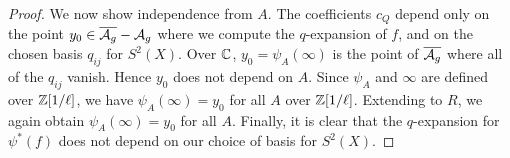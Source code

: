 \documentclass{amsart}
\begin{document}
\begin{proof}
  We now show independence from $A$. The coefficients $c_Q$ depend only on the point $y_0 \in \overline{\mathcal{A}_g} - \mathcal{A}_g$ where we compute the $q$-expansion of $f$, and on the chosen basis $q_{ij}$ for $S^2(X)$. Over $\mathbb{C}$, $y_0 = \psi_A(\infty)$ is the point of $\overline{\mathcal{A}_g}$ where all of the $q_{ij}$ vanish. Hence $y_0$ does not depend on $A$. Since $\psi_A$ and $\infty$ are defined over $\mathbb{Z}[1/\ell]$, we have $\psi_A(\infty) = y_0$ for all $A$ over $\mathbb{Z}[1/\ell]$. Extending to $R$, we again obtain $\psi_A(\infty) = y_0$ for all $A$. Finally, it is clear that the $q$-expansion for $\psi^*(f)$ does not depend on our choice of basis for $S^2(X)$. %
% 
\end{proof}
\end{document}
